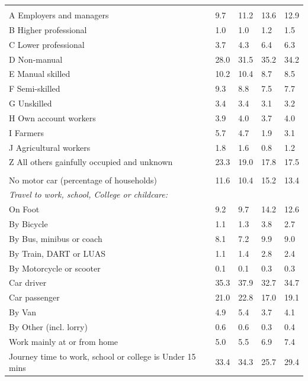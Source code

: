 \documentclass{article}
\begin{document}
\begin{table}[h]
\begin{tabular}{KTTTT}
\hline
    \\ 
    \hline
A Employers and managers &  9.7& 11.2& 13.6& 12.9\\
B Higher professional & 1.0& 1.0& 1.2& 1.5\\
C Lower professional & 3.7& 4.3& 6.4& 6.3\\
D Non-manual & 28.0& 31.5& 35.2& 34.2\\
E Manual skilled & 10.2& 10.4&  8.7&  8.5\\
F Semi-skilled & 9.3& 8.8& 7.5& 7.7\\
G Unskilled & 3.4& 3.4& 3.1& 3.2\\
H Own account workers & 3.9& 4.0& 3.7& 4.0\\
I Farmers & 5.7& 4.7& 1.9& 3.1\\
J Agricultural workers & 1.8& 1.6& 0.8& 1.2\\
Z All others gainfully occupied and unknown & 23.3& 19.0& 17.8& 17.5\\
\hline
{}\hline
    \\ 
    \hline
No motor car (percentage of households) & 11.6& 10.4& 15.2& 
13.4\\
    \hline 
\emph{Travel to work, school, College or childcare:} & & & \\
\quad On Foot &  9.2&  9.7& 14.2& 12.6\\ 
\quad By Bicycle & 1.1& 1.3& 3.8& 2.7\\ 
\quad By Bus, minibus or coach & 8.1& 7.2& 9.9& 9.0\\
\quad By Train, DART or LUAS & 1.1& 1.4& 2.8& 2.4\\
\quad By Motorcycle or scooter & 0.1& 0.1& 0.3& 0.3\\
\quad Car driver & 35.3 & 37.9& 32.7& 34.7\\
\quad Car passenger & 21.0& 22.8& 17.0& 19.1\\
\quad By Van & 4.9& 5.4& 3.7& 4.1\\
\quad By Other (incl. lorry) & 0.6& 0.6& 0.3& 0.4\\
    \hline
Work mainly at or from home & 5.0& 5.5& 6.9& 7.4\\
Journey time to work, school or college is Under 15 mins & 33.4& 34.3& 25.7& 29.4\\

\end{tabular}
\end{table}
\end{document}
